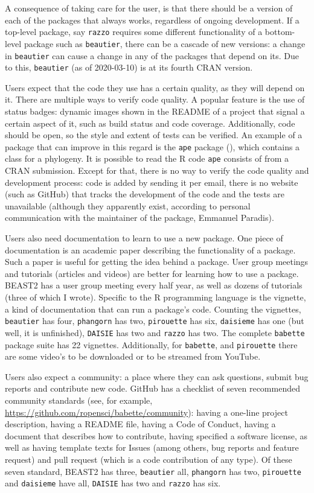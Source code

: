 A consequence of taking care for the user, is that there should be
a version of each of the packages that always works, regardless of ongoing
development. If a top-level package, say \verb;razzo; requires some different 
functionality of a bottom-level package such as \verb;beautier;, there
can be a cascade of new versions: a change in \verb;beautier; 
can cause a change in any of the packages that depend on its.
Due to this, \verb;beautier; (as of 2020-03-10) is at its fourth CRAN version.

Users expect that the code they use has a certain quality,
as they will depend on it. There are multiple ways to verify
code quality. A popular feature is the use of status badges: 
dynamic images shown in the README of a project that 
signal a certain aspect of it, such as build status and code coverage.
Additionally, code should be open, so the style and extent of tests can
be verified. An example of a package that can improve in this
regard is the \verb;ape; package (\cite{ape}), which contains
a class for a phylogeny. It is possible to read the R code \verb;ape; consists
of from a CRAN submission. Except for that, there is no way to 
verify the code quality and development process: code is added by sending 
it per email, there is no website (such as
GitHub) that tracks the development of the code and the tests are 
unavailable (although they apparently exist, according to personal 
communication with the maintainer of the package, Emmanuel Paradis). 

Users also need documentation to learn to use a new package.
One piece of documentation is an academic paper describing the functionality
of a package. Such a paper is useful for getting the idea behind a package.
User group meetings and tutorials (articles and videos) are better for
learning how to use a package. BEAST2 has a user group meeting every half year,
as well as dozens of tutorials (three of which I wrote). Specific to
the R programming language is the vignette, a kind of documentation that
can run a package's code. Counting the vignettes, \verb;beautier; has four, 
\verb;phangorn; has two, \verb;pirouette; has six, \verb;daisieme; has one (but well,
it is unfinished), \verb;DAISIE; has two and \verb;razzo; has two. 
The complete \verb;babette; package suite has
22 vignettes.
Additionally, for \verb;babette;, and \verb;pirouette; there are some video's to
be downloaded or to be streamed from YouTube.

Users also expect a community: a place where they can ask questions,
submit bug reports and contribute new code. GitHub has a checklist of
seven recommended community standards (see, for 
example, \url{https://github.com/ropensci/babette/community}): having 
a one-line project description, 
having a README file, having a Code of Conduct, having a
document that describes how to contribute, having specified a software license, 
as well as having template texts for Issues (among others, bug reports
and feature request) and pull request (which is a code contribution of any type).
Of these seven standard, BEAST2 has three, 
\verb;beautier; all, \verb;phangorn; has two, \verb;pirouette; and \verb;daisieme; have all,
\verb;DAISIE; has two and \verb;razzo; has six.

